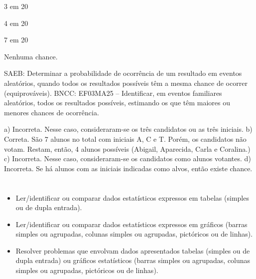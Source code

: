 \begin{escolha}
{\begin{escolha}
\begin{escolha}
\item
3 em 20
\item
4 em 20
\item
7 em 20
\item
Nenhuma chance.
\end{escolha}

SAEB: Determinar a probabilidade de ocorrência de um resultado em eventos aleatórios, quando todos os resultados possíveis têm a mesma chance de ocorrer (equiprováveis). 
BNCC: EF03MA25 -- Identificar, em eventos familiares aleatórios, todos os resultados possíveis,
estimando os que têm maiores ou menores chances de ocorrência.

a) Incorreta. Nesse caso, consideraram-se os três candidatos ou as três iniciais.
b) Correta. São 7 alunos no total com iniciais A, C e T. Porém, os candidatos não votam. Restam, então, 4 alunos possíveis (Abigail, Aparecida, Carla e Coralina.)
c) Incorreta. Nesse caso, consideraram-se os candidatos como alunos votantes.
d) Incorreta. Se há alunos com as iniciais indicadas como alvos, então existe chance.

\chapter{}


\begin{itemize}
    \item Ler/identificar ou comparar dados estatísticos expressos em tabelas
(simples ou de dupla entrada).

    \item Ler/identificar ou comparar dados estatísticos expressos em gráficos
(barras simples ou agrupadas, colunas simples ou agrupadas, pictóricos
ou de linhas).

    \item Resolver problemas que envolvam dados apresentados tabelas (simples ou
de dupla entrada) ou gráficos estatísticos (barras simples ou agrupadas,
colunas simples ou agrupadas, pictóricos ou de linhas).
\end{itemize}


\end{escolha}}
\end{escolha}
